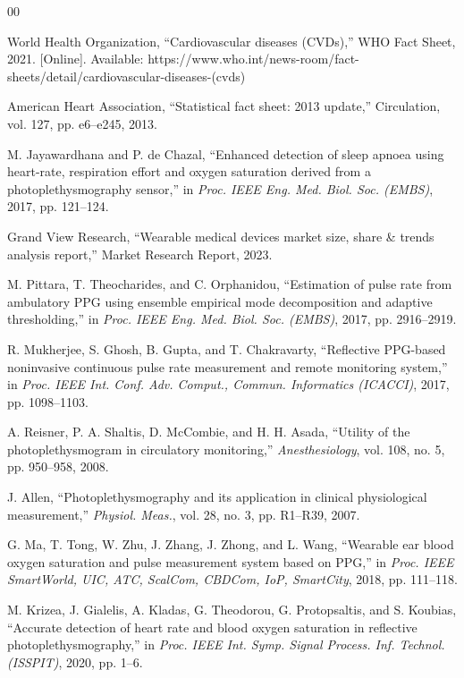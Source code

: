 \documentclass{ieeeaccess}
\begin{document}
\begin{thebibliography}{00}

 World Health Organization, ``Cardiovascular diseases (CVDs),'' WHO Fact Sheet, 2021. [Online]. Available: https://www.who.int/news-room/fact-sheets/detail/cardiovascular-diseases-(cvds)

 American Heart Association, ``Statistical fact sheet: 2013 update,'' Circulation, vol. 127, pp. e6--e245, 2013.

 M. Jayawardhana and P. de Chazal, ``Enhanced detection of sleep apnoea using heart-rate, respiration effort and oxygen saturation derived from a photoplethysmography sensor,'' in \emph{Proc. IEEE Eng. Med. Biol. Soc. (EMBS)}, 2017, pp. 121--124.

 Grand View Research, ``Wearable medical devices market size, share \& trends analysis report,'' Market Research Report, 2023.

 M. Pittara, T. Theocharides, and C. Orphanidou, ``Estimation of pulse rate from ambulatory PPG using ensemble empirical mode decomposition and adaptive thresholding,'' in \emph{Proc. IEEE Eng. Med. Biol. Soc. (EMBS)}, 2017, pp. 2916--2919.

 R. Mukherjee, S. Ghosh, B. Gupta, and T. Chakravarty, ``Reflective PPG-based noninvasive continuous pulse rate measurement and remote monitoring system,'' in \emph{Proc. IEEE Int. Conf. Adv. Comput., Commun. Informatics (ICACCI)}, 2017, pp. 1098--1103.

 A. Reisner, P. A. Shaltis, D. McCombie, and H. H. Asada, ``Utility of the photoplethysmogram in circulatory monitoring,'' \emph{Anesthesiology}, vol. 108, no. 5, pp. 950--958, 2008.

 J. Allen, ``Photoplethysmography and its application in clinical physiological measurement,'' \emph{Physiol. Meas.}, vol. 28, no. 3, pp. R1--R39, 2007.

 G. Ma, T. Tong, W. Zhu, J. Zhang, J. Zhong, and L. Wang, ``Wearable ear blood oxygen saturation and pulse measurement system based on PPG,'' in \emph{Proc. IEEE SmartWorld, UIC, ATC, ScalCom, CBDCom, IoP, SmartCity}, 2018, pp. 111--118.

 M. Krizea, J. Gialelis, A. Kladas, G. Theodorou, G. Protopsaltis, and S. Koubias, ``Accurate detection of heart rate and blood oxygen saturation in reflective photoplethysmography,'' in \emph{Proc. IEEE Int. Symp. Signal Process. Inf. Technol. (ISSPIT)}, 2020, pp. 1--6.


\end{thebibliography}
\end{document}
